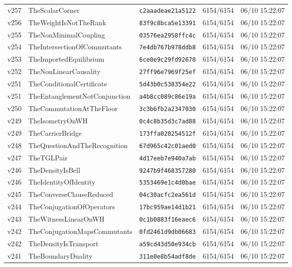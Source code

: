 \documentclass[11pt]{article}
\theoremstyle{definition}\newtheorem{deriv}{Derivação}
\begin{document}
{\begin{longtable}{@{}lllll@{}}
v257 & TheScalarCorner & \texttt{c2aaadeae21a5122} & 6154/6154 & 06/10 15:22:07 \\
v256 & TheWeightIsNotTheRank & \texttt{83f9c8bca5e13391} & 6154/6154 & 06/10 15:22:07 \\
v255 & TheNonMinimalCoupling & \texttt{03576ea2958ffc4c} & 6154/6154 & 06/10 15:22:07 \\
v254 & TheIntersectionOfCommutants & \texttt{7e4db767b978ddb8} & 6154/6154 & 06/10 15:22:07 \\
v253 & TheImportedEquilibrium & \texttt{6ce0e9c29fd92670} & 6154/6154 & 06/10 15:22:07 \\
v252 & TheNonLinearCausality & \texttt{27ff96e7969f25ef} & 6154/6154 & 06/10 15:22:07 \\
v251 & TheConditionalCertificate & \texttt{5d43b0c538354e22} & 6154/6154 & 06/10 15:22:07 \\
v251 & TheEntanglementNotConjunction & \texttt{a4b8cc089c86e19a} & 6154/6154 & 06/10 15:22:07 \\
v250 & TheCommutationAtTheFloor & \texttt{3c3b6fb2a2347030} & 6154/6154 & 06/10 15:22:07 \\
v249 & TheIsometryOnWH & \texttt{0c4c8b35d3c7ad88} & 6154/6154 & 06/10 15:22:07 \\
v249 & TheCarrierBridge & \texttt{173ffa020254512f} & 6154/6154 & 06/10 15:22:07 \\
v248 & TheQuestionAndTheRecognition & \texttt{67d965c42c01aed0} & 6154/6154 & 06/10 15:22:07 \\
v247 & TheTGLPair & \texttt{4d17eeb7e940a7ab} & 6154/6154 & 06/10 15:22:07 \\
v246 & TheDensityIsBell & \texttt{9247b9f468357280} & 6154/6154 & 06/10 15:22:07 \\
v246 & TheIdentityOfIdentity & \texttt{5353469e1c4d0bae} & 6154/6154 & 06/10 15:22:07 \\
v245 & TheConverseClauseReduced & \texttt{04c30acfc2ea561d} & 6154/6154 & 06/10 15:22:07 \\
v244 & TheConjugationOfOperators & \texttt{17bc959ae14d1b21} & 6154/6154 & 06/10 15:22:07 \\
v243 & TheWitnessLinearOnWH & \texttt{0c1b0883f16eaec6} & 6154/6154 & 06/10 15:22:07 \\
v242 & TheConjugationMapsCommutants & \texttt{0fd2461d9db06683} & 6154/6154 & 06/10 15:22:07 \\
v242 & TheDensityIsTransport & \texttt{a59cd43d50e934cb} & 6154/6154 & 06/10 15:22:07 \\
v241 & TheBoundaryDuality & \texttt{311e0e8b54adf8de} & 6154/6154 & 06/10 15:22:07 \\

\end{longtable}}
\end{document}
